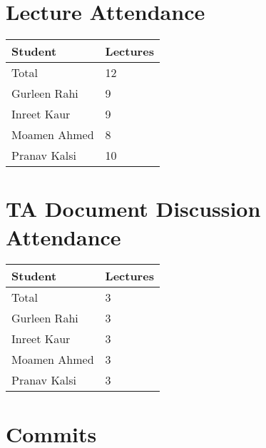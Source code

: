 \documentclass{article}
\begin{document}
\section{Lecture Attendance}


\begin{table}[H]
\centering
\begin{tabular}{ll}
\toprule
\textbf{Student} & \textbf{Lectures}\\
\midrule
Total & 12\\
Gurleen Rahi & 9\\ 
Inreet Kaur & 9\\
Moamen Ahmed & 8\\
Pranav Kalsi & 10\\
\bottomrule
\end{tabular}
\end{table}


\section{TA Document Discussion Attendance}


\begin{table}[H]
\centering
\begin{tabular}{ll}
\toprule
\textbf{Student} & \textbf{Lectures}\\
\midrule
Total & 3\\
Gurleen Rahi & 3\\
Inreet Kaur & 3\\
Moamen Ahmed & 3\\
Pranav Kalsi & 3\\
\bottomrule
\end{tabular}
\end{table}


\section{Commits}
\end{document}

